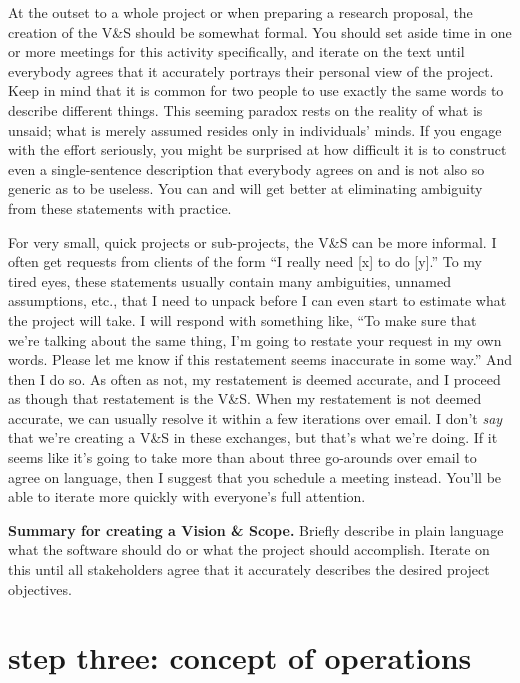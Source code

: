 \documentclass[12pt,oneside]{book}
\begin{document}
At the outset to a whole project or when preparing a research proposal, the creation of the V\&S should be somewhat formal. You should set aside time in one or more meetings for this activity specifically, and iterate on the text until everybody agrees that it accurately portrays their personal view of the project. Keep in mind that it is common for two people to use exactly the same words to describe different things. This seeming paradox rests on the reality of what is unsaid; what is merely assumed resides only in individuals' minds. If you engage with the effort seriously, you might be surprised at how difficult it is to construct even a single-sentence description that everybody agrees on and is not also so generic as to be useless. You can and will get better at eliminating ambiguity from these statements with practice.

For very small, quick projects or sub-projects, the V\&S can be more informal. I often get requests from clients of the form ``I really need [x] to do [y].'' To my tired eyes, these statements usually contain many ambiguities, unnamed assumptions, etc., that I need to unpack before I can even start to estimate what the project will take. I will respond with something like, ``To make sure that we're talking about the same thing, I'm going to restate your request in my own words. Please let me know if this restatement seems inaccurate in some way.'' And then I do so. As often as not, my restatement is deemed accurate, and I proceed as though that restatement is the V\&S. When my restatement is not deemed accurate, we can usually resolve it within a few iterations over email. I don't \emph{say} that we're creating a V\&S in these exchanges, but that's what we're doing. If it seems like it's going to take more than about three go-arounds over email to agree on language, then I suggest that you schedule a meeting instead. You'll be able to iterate more quickly with everyone's full attention.

\hfill
\begin{mdframed}[everyline=true]
\textbf{Summary for creating a Vision \& Scope.} Briefly describe in plain language what the software should do or what the project should accomplish. Iterate on this until all stakeholders agree that it accurately describes the desired project objectives.
\end{mdframed}

\newpage
{}
\section*{step three: concept of operations}
\label{scrivauto:18}
\end{document}
